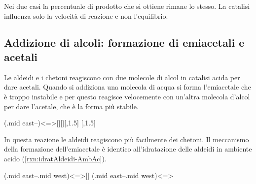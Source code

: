 Nei due casi la percentuale di prodotto che si ottiene rimane lo stesso. La catalisi influenza solo la velocità di reazione e non l'equilibrio.


\subsection{Addizione di alcoli: formazione di emiacetali e acetali}\label{sec:formazioneEmiacetali}
Le aldeidi e i chetoni reagiscono con due molecole di alcol in catalisi acida per dare acetali. Quando si addiziona una molecola di acqua si forma l'emiacetale che è troppo instabile e per questo reagisce velocemente con un'altra molecola d'alcol per dare l'acetale, che è la forma più stabile.
\begingroup
{}
\begin{reaction}
	\arrow(.mid east--){<=>[][]}[,1.5]
	[,1.5]
\end{reaction}
\chemnameinit{}
\endgroup

In questa reazione le aldeidi reagiscono più facilmente dei chetoni. Il meccanismo della formazione dell'emiacetale è identico all'idratazione delle aldeidi in ambiente acido (\autoref{rxn:idratAldeidi-AmbAc}).
\begingroup
{}
\begin{reaction*}
	\arrow(.mid east--.mid west){<=>[]}
	\arrow{<=>[\chemfig{R-@{OH}\charge{90=\:,270=\:}{O}H}]}
	\arrow(.mid east--.mid west){<=>}
\end{reaction*}
\endgroup

